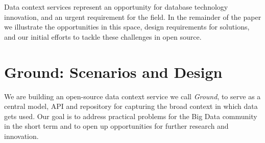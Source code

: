 \documentclass{sig-alternate}
\begin{document}

\smallitembot

Data context services represent an opportunity for database technology innovation, and an urgent requirement for the field.
In the remainder of the paper we illustrate the opportunities in this space, design requirements for solutions, and our initial efforts to tackle these challenges in open source.


\section{Ground: Scenarios and Design}
We are building an open-source data context service we call \emph{Ground}, to serve as a central model, API and repository for capturing the broad context in which data gets used. 
Our goal is to address practical problems for the Big Data community in the short term and to open up opportunities for further research and innovation.
\end{document}
